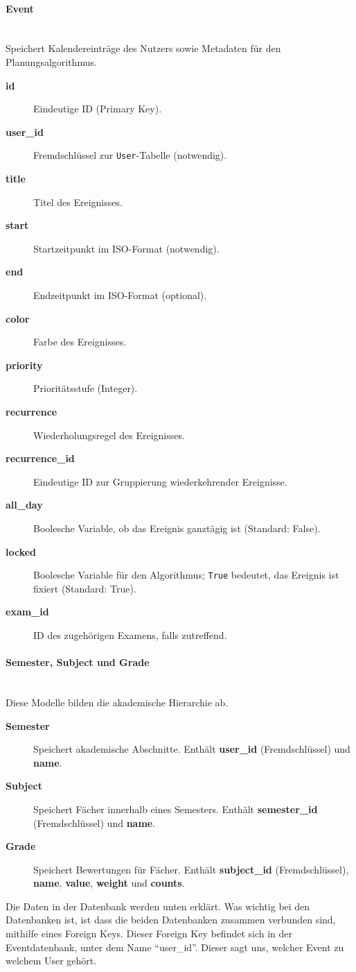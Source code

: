 \documentclass[12pt,a4paper]{report}
\newcommand{\myparagraph}[1]{\paragraph{#1}\mbox{}\\}
\begin{document}
\myparagraph{Event}
Speichert Kalendereinträge des Nutzers sowie Metadaten für den Planungsalgorithmus.
\begin{description}
    \item[\textbf{id}] Eindeutige ID (Primary Key).
    \item[\textbf{user\_id}] Fremdschlüssel zur \texttt{User}-Tabelle (notwendig).
    \item[\textbf{title}] Titel des Ereignisses.
    \item[\textbf{start}] Startzeitpunkt im ISO-Format (notwendig).
    \item[\textbf{end}] Endzeitpunkt im ISO-Format (optional).
    \item[\textbf{color}] Farbe des Ereignisses.
    \item[\textbf{priority}] Prioritätsstufe (Integer).
    \item[\textbf{recurrence}] Wiederholungsregel des Ereignisses.
    \item[\textbf{recurrence\_id}] Eindeutige ID zur Gruppierung wiederkehrender Ereignisse.
    \item[\textbf{all\_day}] Boolesche Variable, ob das Ereignis ganztägig ist (Standard: False).
    \item[\textbf{locked}] Boolesche Variable für den Algorithmus; \texttt{True} bedeutet, das Ereignis ist fixiert (Standard: True).
    \item[\textbf{exam\_id}] ID des zugehörigen Examens, falls zutreffend.
\end{description}

\myparagraph{Semester, Subject und Grade}
Diese Modelle bilden die akademische Hierarchie ab.
\begin{description}
    \item[\textbf{Semester}] Speichert akademische Abschnitte. Enthält \textbf{user\_id} (Fremdschlüssel) und \textbf{name}.
    \item[\textbf{Subject}] Speichert Fächer innerhalb eines Semesters. Enthält \textbf{semester\_id} (Fremdschlüssel) und \textbf{name}.
    \item[\textbf{Grade}] Speichert Bewertungen für Fächer. Enthält \textbf{subject\_id} (Fremdschlüssel), \textbf{name}, \textbf{value}, \textbf{weight} und \textbf{counts}.
\end{description}

Die Daten in der Datenbank werden unten erklärt. Was wichtig bei den Datenbanken ist, ist dass die beiden Datenbanken zusammen verbunden sind, mithilfe eines Foreign Keys. Dieser Foreign Key befindet sich in der Eventdatenbank, unter dem Name ``user\_id''. Dieser sagt uns, welcher Event zu welchem User gehört.
\end{document}
